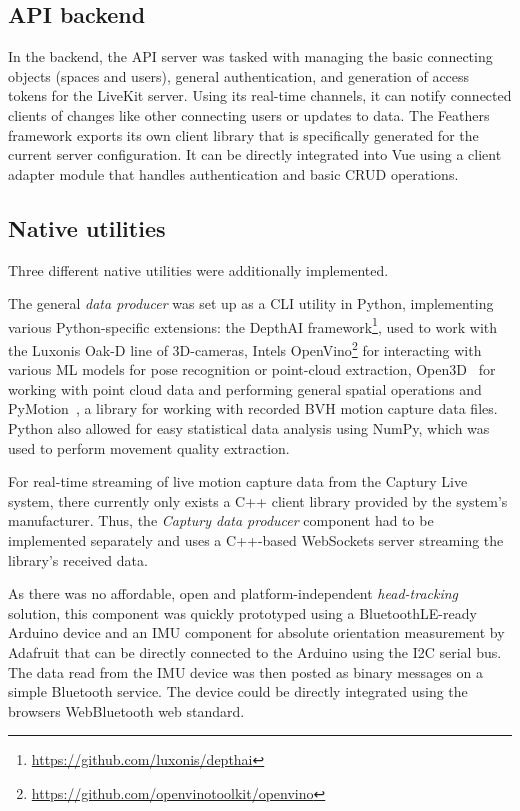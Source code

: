 \subsection{API backend}
\label{subsec:api-backend}

In the backend, the \ac{API} server was tasked with managing the basic connecting objects (spaces and users), general authentication, and generation of access tokens for the LiveKit server.
Using its real-time channels, it can notify connected clients of changes like other connecting users or updates to data.
The Feathers framework exports its own client library that is specifically generated for the current server configuration.
It can be directly integrated into Vue using a client adapter module that handles authentication and basic \ac{CRUD} operations.

\subsection{Native utilities}
\label{subsec:native-utilities}

Three different native utilities were additionally implemented.

The general \emph{data producer} was set up as a \ac{CLI} utility in Python, implementing various Python-specific extensions: the DepthAI framework\footnote{\url{https://github.com/luxonis/depthai}}, used to work with the Luxonis Oak-D line of \ac{3D}-cameras, Intel\textquotesingle s OpenVino\footnote{\url{https://github.com/openvinotoolkit/openvino}} for interacting with various \ac{ML} models for pose recognition or point-cloud extraction, Open3D~\parencite{open3DZhou2018} for working with point cloud data and performing general spatial operations and PyMotion~\parencite{githubPyMotion}, a library for working with recorded \ac{BVH} motion capture data files.
Python also allowed for easy statistical data analysis using NumPy, which was used to perform movement quality extraction.

For real-time streaming of live motion capture data from the Captury Live system, there currently only exists a C++ client library provided by the system's manufacturer.
Thus, the \emph{Captury data producer} component had to be implemented separately and uses a C++-based WebSockets server streaming the library's received data.

As there was no affordable, open and platform-independent \emph{head-tracking} solution, this component was quickly prototyped using a BluetoothLE-ready Arduino device and an \ac{IMU} component for absolute orientation measurement by Adafruit that can be directly connected to the Arduino using the \ac{I2C} serial bus.
The data read from the \ac{IMU} device was then posted as binary messages on a simple Bluetooth service.
The device could be directly integrated using the browser\textquotesingle s WebBluetooth web standard.

